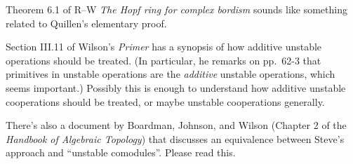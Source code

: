 Theorem 6.1 of R--W \textit{The Hopf ring for complex bordism} sounds like something related to Quillen's elementary proof.

Section III.11 of Wilson's \textit{Primer} has a synopsis of how additive unstable operations should be treated.  (In particular, he remarks on pp.\ 62-3 that primitives in unstable operations are the \emph{additive} unstable operations, which seems important.)  Possibly this is enough to understand how additive unstable cooperations should be treated, or maybe unstable cooperations generally.

There's also a document by Boardman, Johnson, and Wilson (Chapter 2 of the \textit{Handbook of Algebraic Topology}) that discusses an equivalence between Steve's approach and ``unstable comodules''.  Please read this.






